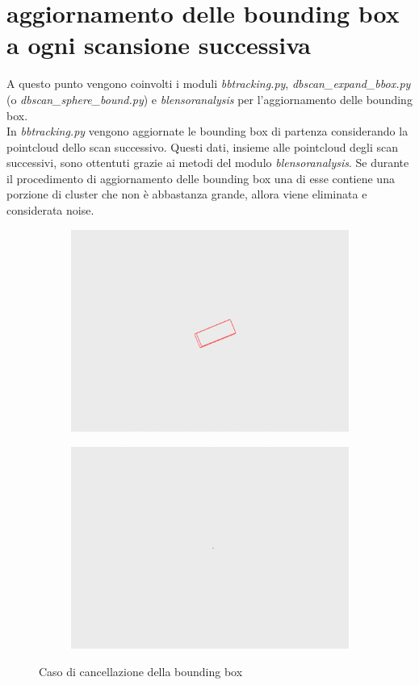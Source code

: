 \documentclass[italian]{report}
\begin{document}
\section{aggiornamento delle bounding box a ogni scansione successiva}
A questo punto vengono coinvolti i moduli \textit{bbtracking.py}, \textit{dbscan\_expand\_bbox.py} (o \textit{dbscan\_sphere\_bound.py}) e \textit{blensoranalysis} per l'aggiornamento delle bounding box.\\
In \textit{bbtracking.py} vengono aggiornate le bounding box di partenza considerando la pointcloud dello scan successivo. Questi dati, insieme alle pointcloud degli scan successivi, sono ottentuti grazie ai metodi del modulo \textit{blensoranalysis}. Se durante il procedimento di aggiornamento delle bounding box una di esse contiene una porzione di cluster che non è abbastanza grande, allora viene eliminata e considerata noise.\\
\begin{figure}[H]
	\centering
	\begin{subfigure}{0.45\textwidth}
		\includegraphics[width=\textwidth]{bb}
	\end{subfigure}
	\begin{subfigure}{0.45\textwidth}
		\includegraphics[width=\textwidth]{nobb}
	\end{subfigure}
	\footnotesize
	\caption{Caso di cancellazione della bounding box}
\end{figure}
\end{document}
